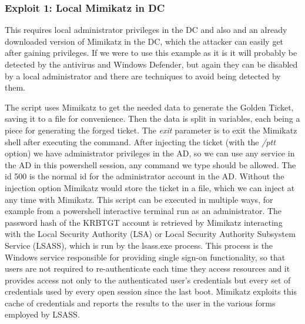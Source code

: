 \subsubsection{Exploit 1: Local Mimikatz in DC}
This requires local administrator privileges in the DC and also and an already downloaded version of Mimikatz in the DC, which the attacker can easily get after gaining privileges. If we were to use this example as it is it will probably be detected by the antivirus and Windows Defender, but again they can be disabled by a local administrator and there are techniques to avoid being detected by them.
\linej

\linej
The script uses Mimikatz to get the needed data to generate the Golden Ticket, saving it to a file for convenience. Then the data is split in variables, each being a piece for generating the forged ticket. The \textit{exit} parameter is to exit the Mimikatz shell after executing the command.
\linej
After injecting the ticket (with the \textit{/ptt} option) we have administrator privileges in the AD, so we can use any service in the AD in this powershell session, any command we type should be allowed. The id 500 is the normal id for the administrator account in the AD. Without the injection option Mimikatz would store the ticket in a file, which we can inject at any time with Mimikatz. This script can be executed in multiple ways, for example from a powershell interactive terminal run as an administrator.
\linej
\linej
The password hash of the KRBTGT account is retrieved by Mimikatz interacting with the Local Security Authority (LSA) or Local Security Authority Subsystem Service (LSASS), which is run by the lsass.exe process.
This process is the Windows service responsible for providing single sign-on functionality, so that users are not required to re-authenticate each time they access resources and it provides access not only to the authenticated user's credentials but every set of credentials used by every open session since the last boot.
\linej
Mimikatz exploits this cache of credentials and reports the results to the user in the various forms employed by LSASS\cite{SANS_mimikatz}\cite{wikipedia_lsass}\cite{pentestlab}\cite{lsadump_patch_inject}\cite{dump_ways}.

